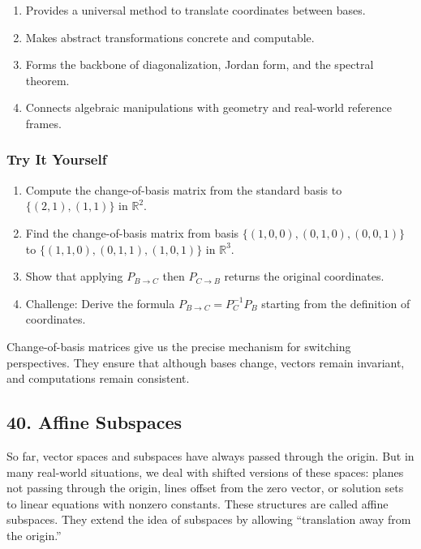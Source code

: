\documentclass[
  letterpaper,
  DIV=11,
  numbers=noendperiod]{scrreprt}
\providecommand{\tightlist}{%
  \setlength{\itemsep}{0pt}\setlength{\parskip}{0pt}}
\begin{document}
\begin{enumerate}
\def\labelenumi{\arabic{enumi}.}
\tightlist
\item
  Provides a universal method to translate coordinates between bases.
\item
  Makes abstract transformations concrete and computable.
\item
  Forms the backbone of diagonalization, Jordan form, and the spectral
  theorem.
\item
  Connects algebraic manipulations with geometry and real-world
  reference frames.
\end{enumerate}

\subsubsection{Try It Yourself}\label{try-it-yourself-38}

\begin{enumerate}
\def\labelenumi{\arabic{enumi}.}
\tightlist
\item
  Compute the change-of-basis matrix from the standard basis to
  \(\{(2,1),(1,1)\}\) in \(\mathbb{R}^2\).
\item
  Find the change-of-basis matrix from basis
  \(\{(1,0,0),(0,1,0),(0,0,1)\}\) to \(\{(1,1,0),(0,1,1),(1,0,1)\}\) in
  \(\mathbb{R}^3\).
\item
  Show that applying \(P_{B \to C}\) then \(P_{C \to B}\) returns the
  original coordinates.
\item
  Challenge: Derive the formula \(P_{B \to C} = P_C^{-1} P_B\) starting
  from the definition of coordinates.
\end{enumerate}

Change-of-basis matrices give us the precise mechanism for switching
perspectives. They ensure that although bases change, vectors remain
invariant, and computations remain consistent.

\subsection{40. Affine Subspaces}\label{affine-subspaces}

So far, vector spaces and subspaces have always passed through the
origin. But in many real-world situations, we deal with shifted versions
of these spaces: planes not passing through the origin, lines offset
from the zero vector, or solution sets to linear equations with nonzero
constants. These structures are called affine subspaces. They extend the
idea of subspaces by allowing ``translation away from the origin.''
\end{document}
